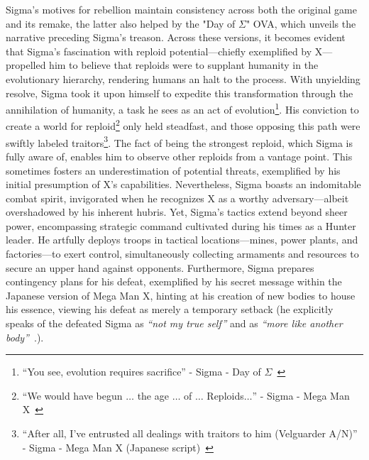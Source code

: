 Sigma's motives for rebellion maintain consistency across both the original game and its remake, the latter also helped by the "Day of $\Sigma$" OVA, which unveils the narrative preceding Sigma's treason. Across these versions, it becomes evident that Sigma's fascination with reploid potential—chiefly exemplified by X—propelled him to believe that reploids were to supplant humanity in the evolutionary hierarchy, rendering humans an halt to the process. With unyielding resolve, Sigma took it upon himself to expedite this transformation through the annihilation of humanity, a task he sees as an act of evolution\footnote{\enquote{You see, evolution requires sacrifice} - Sigma - Day of $\Sigma$~\cite{wiki:Day_of_Sigma_Script}}. His conviction to create a world for reploid\footnote{\enquote{We would have begun $\dots$ the age $\dots$ of $\dots$ Reploids$\dots$} - Sigma - Mega Man X~\cite{wiki:MMX_script}} only held steadfast, and those opposing this path were swiftly labeled traitors\footnote{\enquote{After all, I’ve entrusted all dealings with traitors to him (Velguarder A/N)} - Sigma - Mega Man X (Japanese script)~\cite{wordpress:X_japanese_script}}. The fact of being the strongest reploid, which Sigma is fully aware of, enables him to observe other reploids from a vantage point. This sometimes fosters an underestimation of potential threats, exemplified by his initial presumption of X's capabilities. Nevertheless, Sigma boasts an indomitable combat spirit, invigorated when he recognizes X as a worthy adversary—albeit overshadowed by his inherent hubris. Yet, Sigma's tactics extend beyond sheer power, encompassing strategic command cultivated during his times as a Hunter leader. He artfully deploys troops in tactical locations—mines, power plants, and factories—to exert control, simultaneously collecting armaments and resources to secure an upper hand against opponents. Furthermore, Sigma prepares contingency plans for his defeat, exemplified by his secret message within the Japanese version of Mega Man X, hinting at his creation of new bodies to house his essence, viewing his defeat as merely a temporary setback (he explicitly speaks of the defeated Sigma as \textit{``not my true self''} and as \textit{``more like another body''}~\cite{wordpress:X_japanese_script}.).

